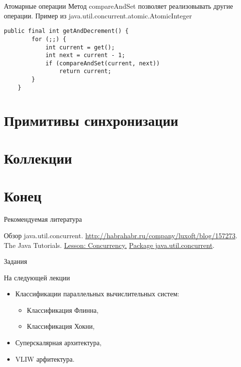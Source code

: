 \begin{frame}[fragile]{Атомарные операции}
Метод compareAndSet позволяет реализовывать другие операции.
\vfill
Пример из java.util.concurrent.atomic.AtomicInteger
\begin{lstlisting}
public final int getAndDecrement() {
        for (;;) {
            int current = get();
            int next = current - 1;
            if (compareAndSet(current, next))
                return current;
        }
    }
\end{lstlisting}
\end{frame}

\section{Примитивы синхронизации}

\section{Коллекции}

\section*{Конец}

\begin{frame}[allowframebreaks]{Рекомендуемая литература}
\begin{thebibliography}{99}
    \bibitem{} Обзор java.util.concurrent.
    \url{http://habrahabr.ru/company/luxoft/blog/157273}.
    \bibitem{} The Java Tutorials.
    \href{http://docs.oracle.com/javase/tutorial/essential/concurrency/index.html}{Lesson: Concurrency.}
    \bibitem{} \href{http://docs.oracle.com/javase/7/docs/api/java/util/concurrent/package-summary.html}{Package java.util.concurrent}.
\end{thebibliography}
\end{frame}

\begin{frame}{Задания}
\end{frame}

\begin{frame}{На следующей лекции}
\begin{itemize}
    \item Классификации параллельных вычислительных систем:
    \begin{itemize}
        \item Классификация Флинна,
        \item Классификация Хокни,
    \end{itemize}
    \item Суперскалярная архитектура,
    \item VLIW арфитектура.
\end{itemize}
\end{frame}

